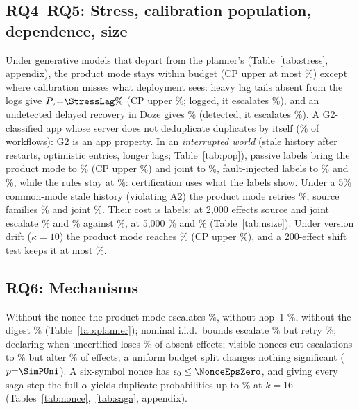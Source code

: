 \subsection{RQ4--RQ5: Stress, calibration population, dependence, size}
\label{sec:eval-stress}\label{sec:eval-pop}
Under generative models that depart from the planner's (Table~\ref{tab:stress}, appendix), the product mode stays within budget (CP upper at most \StressMaxHi\%) except where
calibration misses what deployment sees: heavy lag tails absent from the logs give $P_{\mathrm{v}}{=}\StressLag\%$ (CP upper \StressLagHi\%; logged, it escalates \StressLagCalAsk\%),
and an undetected delayed recovery in Doze gives \StressDoze\% (detected, it escalates \StressDozeAsk\%). A G2-classified app whose server does not deduplicate duplicates by
itself (\StressNodedupDup\% of workflows): G2 is an app property. In an \emph{interrupted world} (stale history after restarts, optimistic entries, longer lags; Table~\ref{tab:pop}),
passive labels bring the product mode to \PopIwPProd\% (CP upper \PopIwPProdHi\%) and joint to \PopIwPJoint\%, fault-injected labels to \PopIwFProd\% and \PopIwFJoint\%, while the
rules stay at \PopIwFRules\%: certification uses what the labels show. Under a 5\% common-mode stale history (violating A2) the product mode retries \PopCmCProd\%, source
families \PopCmCSrc\% and joint \PopCmCJoint\%. Their cost is labels: at 2{,}000 effects source and joint escalate \NcalESrcAsk\% and \NcalEJointAsk\% against \NcalEProdAsk\%,
at 5{,}000 \NcalFSrcAsk\% and \NcalFJointAsk\% (Table~\ref{tab:nsize}). Under version drift ($\kappa{=}10$) the product mode reaches \DriftTenPv\% (CP upper \DriftTenPvHi\%), and a
200-effect shift test keeps it at most \DriftTenTestPvHi\%.

\subsection{RQ6: Mechanisms}
\label{sec:eval-mech}
Without the nonce the product mode escalates \SimNoNonceAsk\%, without hop~1 \SimNoHopAsk\%, without the digest \SimNoDigestAsk\% (Table~\ref{tab:planner}); nominal i.i.d.\
bounds escalate \SimNoCalAsk\% but retry \SimNoCalPv\%; declaring when uncertified loses \SimNoAskLv\% of absent effects; visible nonces cut escalations to \SimVisAsk\% but alter
\SimAltered\% of effects; a uniform budget split changes nothing significant ($p{=}\SimPUni$). A six-symbol nonce has $\epsilon_0\le\NonceEpsZero$, and giving every saga step the
full $\alpha$ yields duplicate probabilities up to \SagaNaiveSixteen\% at $k{=}16$ (Tables~\ref{tab:nonce},~\ref{tab:saga}, appendix).

